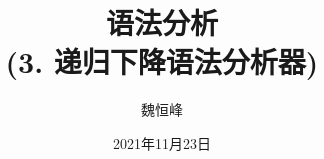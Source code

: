 \documentclass[]{beamer}
\title[语法分析]{语法分析 \\ (3. 递归下降语法分析器)}
\author[魏恒峰]{\large 魏恒峰}
\institute{hfwei@nju.edu.cn}
\date{2021年11月23日}
\begin{document}
\maketitle




\thankyou{}

\end{document}
